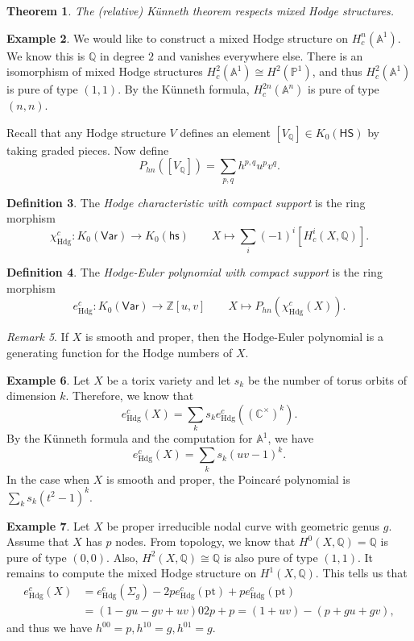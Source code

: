 \documentclass[leqno, openany]{memoir}
\newtheorem{thm}{Theorem}[section]
\theoremstyle{definition}
\newtheorem{defn}[thm]{Definition}
\newtheorem{exm}[thm]{Example}
\theoremstyle{remark}
\newtheorem{rmk}[thm]{Remark}
\theoremstyle{plain}
\theoremstyle{definition}
\theoremstyle{remark}
\newcommand{\A}{\mathbb{A}}
\newcommand{\C}{\mathbb{C}}
\newcommand{\Z}{\mathbb{Z}}
\newcommand{\Q}{\mathbb{Q}}
\renewcommand{\P}{\mathbb{P}}
\newcommand{\mr}[1]{\mathrm{#1}}
\newcommand{\ms}[1]{\mathsf{#1}}
\begin{document}
\begin{thm}
    The (relative) K\"unneth theorem respects mixed Hodge structures.
\end{thm}

\begin{exm}
    We would like to construct a mixed Hodge structure on $H_c^n(\A^1)$. We know this is $\Q$ in degree $2$ and vanishes everywhere else. There is an isomorphism of mixed Hodge structures $H^2_c(\A^1) \cong H^2(\P^1)$, and thus $H^2_c(\A^1)$ is pure of type $(1,1)$. By the K\"unneth formula, $H_c^{2n}(\A^n)$ is pure of type $(n,n)$.
\end{exm}

Recall that any Hodge structure $V$ defines an element $[V_{\Q}] \in K_0(\ms{HS})$ by taking graded pieces. Now define
\[ P_{hn}([V_{\Q}]) = \sum_{p,q} h^{p,q} u^p v^q. \]
\begin{defn}
    The \textit{Hodge characteristic with compact support} is the ring morphism
    \[ \chi_{\mr{Hdg}}^c \colon K_0(\ms{Var}) \to K_0(\ms{hs}) \qquad X \mapsto \sum_i (-1)^i [H_c^i(X, \Q)]. \]
\end{defn}

\begin{defn}
    The \textit{Hodge-Euler polynomial with compact support} is the ring morphism
    \[ e_{\mr{Hdg}}^c \colon K_0(\ms{Var}) \to \Z[u,v] \qquad X \mapsto P_{hn}(\chi_{\mr{Hdg}}^c(X)). \]
\end{defn}

\begin{rmk}
    If $X$ is smooth and proper, then the Hodge-Euler polynomial is a generating function for the Hodge numbers of $X$.
\end{rmk}

\begin{exm}
    Let $X$ be a torix variety and let $s_k$ be the number of torus orbits of dimension $k$. Therefore, we know that
    \[ e_{\mr{Hdg}}^c(X) = \sum_k s_k e_{\mr{Hdg}}^c((\C^{\times})^k). \]
    By the K\"unneth formula and the computation for $\A^1$, we have
    \[ e_{\mr{Hdg}}^c(X) = \sum_k s_k (uv-1)^k. \]
    In the case when $X$ is smooth and proper, the Poincar\'e polynomial is $\sum_k s_k (t^2-1)^k$.
\end{exm}

\begin{exm}
    Let $X$ be proper irreducible nodal curve with geometric genus $g$. Assume that $X$ has $p$ nodes. From topology, we know that $H^0(X, \Q) = \Q$ is pure of type $(0,0)$. Also, $H^2(X, \Q) \cong \Q$ is also pure of type $(1,1)$. It remains to compute the mixed Hodge structure on $H^1(X, \Q)$. This tells us that
    \begin{align*} 
        e_{\mr{Hdg}}^c(X) &= e_{\mr{Hdg}}^c(\Sigma_g) - 2p e_{\mr{Hdg}}^c(\mr{pt}) + p e_{\mr{Hdg}}^c(\mr{pt}) \\
        &= (1-gu-gv + uv) 0 2p + p = (1+uv) - (p + gu + gv),
    \end{align*}
    and thus we have $h^{00} = p, h^{10} = g, h^{01} = g$.
\end{exm}
\end{document}
